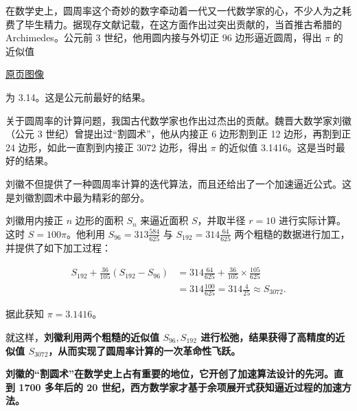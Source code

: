 \documentclass[
  10pt,
  fontset=fandol]{ctexart}
\begin{document}
在数学史上，圆周率这个奇妙的数字牵动着一代又一代数学家的心，不少人为之耗费了毕生精力。据现存文献记载，在这方面作出过突出贡献的，当首推古希腊的 Archimedes。公元前 3 世纪，他用圆内接与外切正 96 边形逼近圆周，得出 \(\pi\) 的近似值

\href{../../source-images/pdf-314.jpeg}{原页图像}

为 3.14。这是公元前最好的结果。

关于圆周率的计算问题，我国古代数学家也作出过杰出的贡献。魏晋大数学家刘徽（公元 3 世纪）曾提出过``割圆术''，他从内接正 6 边形割到正 12 边形，再割到正 24 边形，如此一直割到内接正 3072 边形，得出 \(\pi\) 的近似值 3.1416。这是当时最好的结果。

刘徽不但提供了一种圆周率计算的迭代算法，而且还给出了一个加速逼近公式。这是刘徽割圆术中最为精彩的部分。

刘徽用内接正 \(n\) 边形的面积 \(S_n\) 来逼近面积 \(S\)，并取半径 \(r=10\) 进行实际计算。这时 \(S=100\pi\)。他利用 \(S_{96}=313\frac{584}{625}\) 与 \(S_{192}=314\frac{64}{625}\) 两个粗糙的数据进行加工，并提供了如下加工过程：

\[
\begin{aligned}
S_{192}+\frac{36}{105}(S_{192}-S_{96})
&=314\frac{64}{625}+\frac{36}{105}\times\frac{105}{625}\\
&=314\frac{100}{625}=314\frac{4}{25}\approx S_{3072}.
\end{aligned}
\]

据此获知 \(\pi=3.1416\)。

就这样，\textbf{刘徽利用两个粗糙的近似值 \(S_{96},S_{192}\) 进行松弛，结果获得了高精度的近似值 \(S_{3072}\)，从而实现了圆周率计算的一次革命性飞跃。}

\textbf{刘徽的``割圆术''在数学史上占有重要的地位，它开创了加速算法设计的先河。直到 1700 多年后的 20 世纪，西方数学家才基于余项展开式获知逼近过程的加速方法。}
\end{document}
